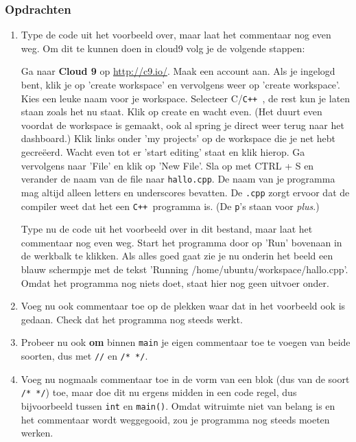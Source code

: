 \documentclass[12pt,a4paper]{article}
\newcommand{\icode}{\lstinline}
\newcommand{\mono}{\texttt}
\newcommand{\cpp}{\mono{C++ }}
\begin{document}
\subsubsection{Opdrachten}
\begin{enumerate}
	\item
		Type de code uit het voorbeeld over, maar laat het commentaar nog even weg. Om dit te kunnen doen in cloud9 volg je de volgende stappen:
		
		Ga naar \textbf{Cloud 9} op \url{http://c9.io/}. Maak een account aan. Als je ingelogd bent, klik je op 'create workspace' en vervolgens weer op 'create workspace'. Kies een leuke naam voor je workspace. Selecteer C/\cpp, de rest kun je laten staan zoals het nu staat. Klik op create en wacht even. (Het duurt even voordat de workspace is gemaakt, ook al spring je direct weer terug naar het dashboard.) Klik links onder 'my projects' op de workspace die je net hebt gecreëerd. Wacht even tot er 'start editing' staat en klik hierop. Ga vervolgens naar 'File' en klik op 'New File'. Sla op met CTRL + S en verander de naam van de file naar \mono{hallo.cpp}. De naam van je programma mag altijd alleen letters en underscores bevatten. De \mono{.cpp} zorgt ervoor dat de compiler weet dat het een \cpp programma is. (De \mono{p}'s staan voor \emph{plus}.)
		
		Type nu de code uit het voorbeeld over in dit bestand, maar laat het commentaar nog even weg. Start het programma door op 'Run' bovenaan in de werkbalk te klikken. Als alles goed gaat zie je nu onderin het beeld een blauw schermpje met de tekst 'Running /home/ubuntu/workspace/hallo.cpp'. Omdat het programma nog niets doet, staat hier nog geen uitvoer onder.
	\item
		Voeg nu ook commentaar toe op de plekken waar dat in het voorbeeld ook is gedaan. Check dat het programma nog steeds werkt.
	\item
		Probeer nu ook \textbf{om} binnen \icode{main} je eigen commentaar toe te voegen van beide soorten, dus met \icode{//} en \icode{/* */}.
	\item 
		Voeg nu nogmaals commentaar toe in de vorm van een blok (dus van de soort \icode{/* */}) toe, maar doe dit nu ergens midden in een code regel, dus bijvoorbeeld tussen \icode{int} en \icode{main()}. Omdat witruimte niet van belang is en het commentaar wordt weggegooid, zou je programma nog steeds moeten werken.
\end{enumerate}
\end{document}

